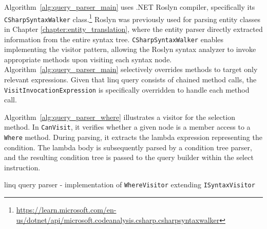 Algorithm~\ref{alg:query_parser_main} uses .NET Roslyn compiler, specifically its \texttt{CSharpSyntaxWalker} class.\footnote{\url{https://learn.microsoft.com/en-us/dotnet/api/microsoft.codeanalysis.csharp.csharpsyntaxwalker}} Roslyn was previously used for parsing entity classes in Chapter \ref{chapter:entity_translation}, where the entity parser directly extracted information from the entire syntax tree. \texttt{CSharpSyntaxWalker} enables implementing the visitor pattern, allowing the Roslyn syntax analyzer to invoke appropriate methods upon visiting each syntax node. Algorithm~\ref{alg:query_parser_main} selectively overrides methods to target only relevant expressions. Given that \acrshort{linq} query consists of chained method calls, the \texttt{VisitInvocationExpression} is specifically overridden to handle each method call.

Algorithm~\ref{alg:query_parser_where} illustrates a visitor for the selection method. In \texttt{CanVisit}, it verifies whether a given node is a member access to a \texttt{Where} method. During parsing, it extracts the lambda expression representing the condition. The lambda body is subsequently parsed by a condition tree parser, and the resulting condition tree is passed to the query builder within the select instruction.

\begin{algorithm}[!htp]
    \footnotesize
    \DontPrintSemicolon



    \caption{\acrshort{linq} query parser - implementation of \texttt{WhereVisitor} extending \texttt{ISyntaxVisitor}}
    \label{alg:query_parser_where}
\end{algorithm}

